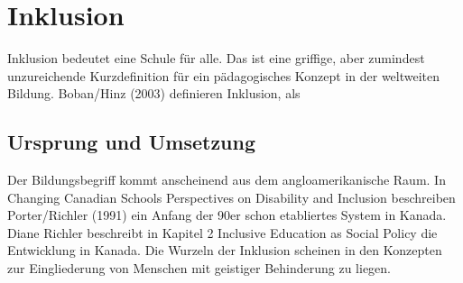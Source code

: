 

\section{Inklusion}
Inklusion bedeutet eine Schule für alle. Das ist eine griffige, aber zumindest unzureichende Kurzdefinition für ein pädagogisches Konzept in der weltweiten Bildung.
Boban/Hinz (2003) definieren Inklusion, als
\subsection{Ursprung und Umsetzung}
Der Bildungsbegriff kommt anscheinend aus dem anglo­amerika­nische Raum. In Changing Canadian Schools Perspectives on Disability and Inclusion beschreiben Porter/Richler (1991) ein Anfang der 90er schon etabliertes System in Kanada. Diane Richler beschreibt in Kapitel 2 Inclusive Education as Social Policy die Entwicklung in Kanada.
Die Wurzeln der Inklusion scheinen in den Konzepten zur Eingliederung von Menschen mit geistiger Behinderung zu liegen.


